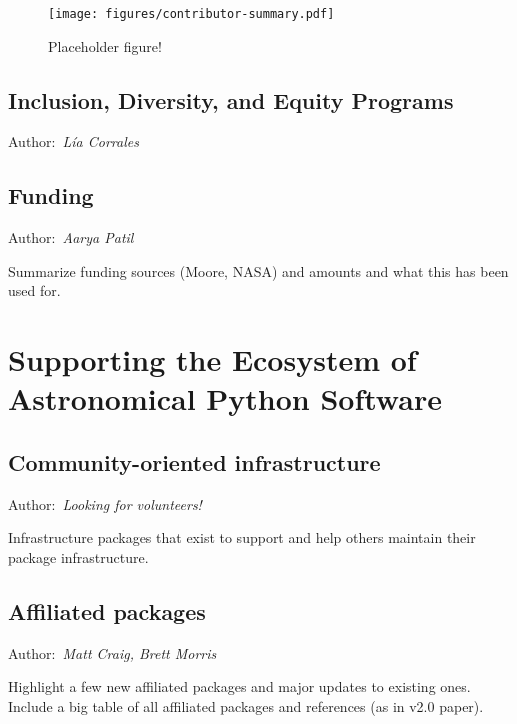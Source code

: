 \documentclass[modern]{aastex631}
\newcommand{\secauthor}[1]{{\color{blue}Author:~\textit{#1}}}
\newcommand{\secunfilled}{{\color{red}Author:~\textit{Looking for volunteers!}}}
\begin{document}
\begin{figure}
    \begin{centering}
        \texttt{[image: figures/contributor-summary.pdf]}
        \caption{Placeholder figure!}
        \label{fig:contributor-summary}
    \end{centering}
\end{figure}


\subsection{Inclusion, Diversity, and Equity Programs} \label{sec:project-ide}

\secauthor{Lía Corrales}


\subsection{Funding} \label{sec:project-funding}

\secauthor{Aarya Patil}

Summarize funding sources (Moore, NASA) and amounts and what this has been used
for.


\section{Supporting the Ecosystem of Astronomical Python Software}
\label{sec:ecosystem}

\subsection{Community-oriented infrastructure}

\secunfilled

Infrastructure packages that exist to support and help others maintain their
package infrastructure.

\subsection{Affiliated packages}

\secauthor{Matt Craig, Brett Morris}

Highlight a few new affiliated packages and major updates to existing ones.
Include a big table of all affiliated packages and references (as in v2.0
paper).
\end{document}

